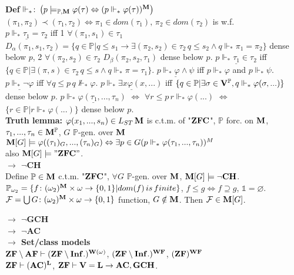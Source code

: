 \documentclass[9pt]{article}
\newcommand{\class}[1]{{\bf #1}}
\newcommand{\Pp}{\mathbb{P}}
\newcommand{\mytitle}[1]{ {\bf $\rightarrow$ #1}\\}
\newcommand{\V}{\class{V}}
\newcommand{\WF}{\class{WF}}
\begin{document}
\begin{multicols*}{2}
{\bf Def} $\Vdash_*\colon \left(p\models_{\Pp,\class{M}}\varphi(\tau)\Leftrightarrow (p\Vdash_*\varphi(\tau))^\class{M}\right)$\\
$(\pi_1,\pi_2)\prec (\tau_1,\tau_2)\Leftrightarrow \pi_1\in dom(\tau_1),\,\pi_2\in dom(\tau_2)$ is w.f.\\
$\underline{p\Vdash_*\tau_1=\tau_2}$ iff
1 $\forall (\pi_1,s_1)\in\tau_1$ $D_\alpha(\pi_1,s_1,\tau_2)=\{q\in\Pp|q\leqslant s_1\to \exists(\pi_2,s_2)\in\tau_2\,q\leqslant s_2\wedge q\Vdash_*\pi_1=\pi_2\}$ dense below $p$, 2 $\forall(\pi_2,s_2)\in\tau_2$ $D_\beta(\pi_2,s_2,\tau_1)$ dense below $p$.
$\underline{p\Vdash_*\tau_1\in\tau_2}$ iff $\{q\in \Pp|\exists (\pi,s)\in\tau_2\,q\leqslant s\wedge q\Vdash_* \pi=\tau_1\}$.
$\underline{p\Vdash_*\varphi\wedge\psi}$ iff $p\Vdash_*\varphi$ and $p\Vdash_*\psi$.
$\underline{p\Vdash_*\neg\varphi}$ iff $\forall q\leqslant p\,q\not\Vdash_*\varphi$.
$\underline{p\Vdash_*\exists x\varphi(x,...)}$ iff $\{q\in \Pp|\exists \sigma\in\V^\Pp,q\Vdash_*\varphi(\sigma,...)\}$ dense below $p$.
$\underline{p\Vdash_*\varphi(\tau_1,...,\tau_n)}$ $\Leftrightarrow$ $\forall r\leqslant p\,r\Vdash_*\varphi(...)$ $\Leftrightarrow$ $\{r\in\Pp|r\Vdash_*\varphi(...)\}$ dense below $p$.\\
{\bf Truth lemma:} $\varphi(x_1,...,s_n)\in L_{ST}\,\class{M}$ is c.t.m. of "$\class{ZFC}$", $\Pp$ forc. on $\class{M}$, $\tau_1,...,\tau_n\in\class{M}^\Pp$, $G$ $\Pp$-gen. over $\class{M}$ $\class{M}[G]\models \varphi((\tau_1)_G,...,(\tau_n)_G)\Leftrightarrow\exists p\in G(p\Vdash_*\varphi(\tau_1,...,\tau_n))^M$\\
also $\class{M}[G]\models "\class{ZFC}"$.\\
\mytitle{$\neg$CH}
Define $\Pp\in\class{M}$ c.t.m. "$\class{ZFC}$", $\forall G$ $\Pp$-gen. over $\class{M}$, $\class{M}[G]\models\neg\class{CH}$.
$\Pp_{\omega_2}=\{f\colon (\omega_2)^\class{M}\times\omega\to\{0,1\}|dom(f)\,is\,finite\}$, $f\leqslant g\Leftrightarrow f\supseteq g$, $\mathbb{1}=\varnothing$.
$\mathcal{F}=\bigcup G\colon (\omega_2)^\class{M}\times\omega\to\{0,1\}$ function, $G\notin\class{M}$. Then $\mathcal{F}\in\class{M}[G]$.

\mytitle{$\neg$\class{GCH}}

\mytitle{$\neg$\class{AC}}

\mytitle{Set/class models}
$\class{ZF}\setminus \class{AF}\vdash (\class{ZF}\setminus \class{Inf.})^{\class{W}(\omega)}$, $(\class{ZF}\setminus \class{Inf.})^\WF$, $(\class{ZF})^\WF$\\
$\class{ZF}\vdash (\class{AC})^{\class{L}}$, $\class{ZF}\vdash \V=\class{L}\to \class{AC}, \class{GCH}$.
\end{multicols*}
\end{document}
